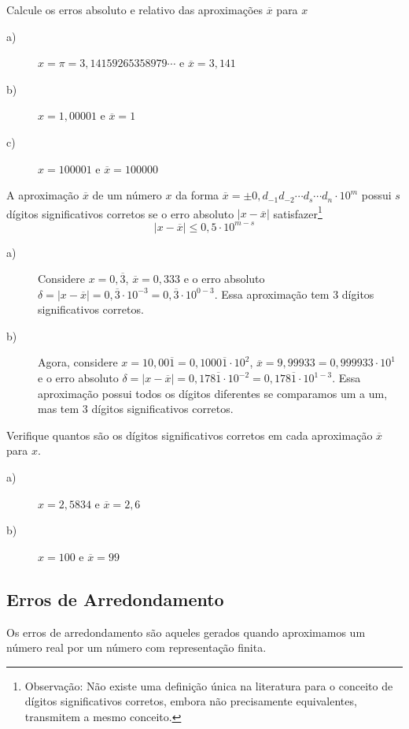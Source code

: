 \begin{prob}Calcule os erros absoluto e relativo das aproximações $\overline{x}$ para $x$
\begin{description}
\item[a)] $x=\pi=3,14159265358979\cdots$ e $\overline{x}=3,141$
\item[b)] $x=1,00001$ e $\overline{x}=1$
\item[c)] $x=100001$ e $\overline{x}=100000$
\end{description}
\end{prob}

\begin{defn}
A aproximação $\overline{x}$ de um número $x$ da forma $\overline{x}=\pm 0,d_{-1}d_{-2}\cdots d_{s}\cdots d_n\cdot 10^m$ possui $s$ dígitos significativos corretos se o erro absoluto $|x-\overline{x}|$ satisfazer\footnote{Observação: Não existe uma definição única na literatura para o conceito de dígitos significativos corretos, embora não precisamente equivalentes, transmitem a mesmo conceito.}
$$
|x-\overline{x}|\leq 0,5\cdot 10^{m-s}
$$
\end{defn}
\begin{ex}
\begin{description}
\item[a)] Considere $x=0,\overline{3}$, $\overline{x}=0,333$ e o erro absoluto $\delta=|x-\overline{x}|=0,\overline{3}\cdot 10^{-3}=0,\overline{3}\cdot 10^{0-3}$. Essa aproximação tem 3 dígitos significativos corretos.
\item[b)] Agora, considere $x=10,00\overline{1}=0,1000\overline{1}\cdot 10^{2}$, $\overline{x}=9,99933=0,999933\cdot 10^1$ e o erro absoluto $\delta=|x-\overline{x}|=0,178\overline{1}\cdot 10^{-2}=0,178\overline{1}\cdot 10^{1-3}$. Essa aproximação possui todos os dígitos diferentes se comparamos um a um, mas tem 3 dígitos significativos corretos.
\end{description}
\end{ex}
\begin{prob}
Verifique quantos são os dígitos significativos corretos em cada aproximação $\overline{x}$ para $x$.
\begin{description}
\item[a)] $x=2,5834$ e $\overline{x}=2,6$
\item[b)] $x=100$ e $\overline{x}=99$
\end{description}
\end{prob}



\subsection{Erros de Arredondamento}{\label{arredondamento_sec}}
Os erros de arredondamento são aqueles gerados quando aproximamos um número real por um número com representação finita.

